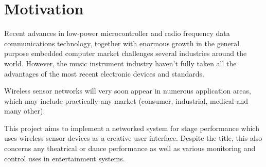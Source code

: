 \section{Motivation}

  Recent advances in low-power microcontroller and radio frequency data communications
 technology, together with enormous growth in the general purpose embedded computer
 market challenges several industries around the world. However, the music instrument
 industry haven't fully taken all the advantages of the most recent electronic devices
 and standards.
 
 Wireless sensor networks will very soon appear in numerous application areas,
 which may include practically any market (consumer, industrial, medical and many other).
 
 This project aims to implement a networked system for stage performance which uses
 wireless sensor devices as a creative user interface. Despite the title, this also
 concerns any theatrical or dance performance as well as various monitoring and
 control uses in entertainment systems.

